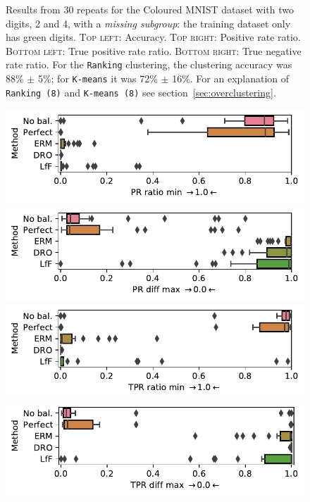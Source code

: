 \begin{figure}[htp]
  \caption{
    Results from 30 repeats for the Coloured MNIST dataset with two digits, 2 and 4, with a \emph{missing subgroup}: the training dataset only has {\color{green}green} digits.
    \textsc{Top left}: Accuracy.
    \textsc{Top right}: Positive rate ratio.
    \textsc{Bottom left}: True positive rate ratio.
    \textsc{Bottom right}: True negative rate ratio.
    For the \texttt{Ranking} clustering, the clustering accuracy was 88\% $\pm$ 5\%;
    for \texttt{K-means} it was 72\% $\pm$ 16\%.
    For an explanation of \texttt{Ranking (8)} and \texttt{K-means (8)} see section~\ref{sec:overclustering}.
  }%
  \label{fig:cmnist-2v4-miss-s-add}
\end{figure}
\begin{figure}[htp]
  \centering
  \includegraphics[width=0.8\columnwidth]{paper3/figures/cmnist_3dig_4miss_prr-min.pdf}
  \includegraphics[width=0.8\columnwidth]{paper3/figures/cmnist_3dig_4miss_prd-max.pdf}
  \includegraphics[width=0.8\columnwidth]{paper3/figures/cmnist_3dig_4miss_tprr-min.pdf}
  \includegraphics[width=0.8\columnwidth]{paper3/figures/cmnist_3dig_4miss_tprd-max.pdf}

\end{figure}
